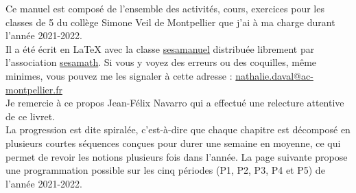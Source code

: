 Ce manuel est composé de l'ensemble des activités, cours, exercices pour les classes de 5 du collège Simone Veil de Montpellier que j'ai à ma charge durant l'année 2021-2022. \\ [1mm]
Il a été écrit en \LaTeX{} avec la classe \href{https://www.ctan.org/pkg/sesamanuel}{\blue sesamanuel} distribuée librement par l'association \href{http://www.sesamath.net}{\blue sesamath}. Si vous y voyez des erreurs ou des coquilles, même minimes, vous pouvez me les signaler à cette adresse : \href{mailto:nathalie.daval@ac-montpellier.fr}{nathalie.daval@ac-montpellier.fr} \\
Je remercie à ce propos Jean-Félix Navarro qui a effectué une relecture attentive de ce livret. \\ [10mm]

La progression est dite spiralée, c'est-à-dire que chaque \og chapitre \fg{} est décomposé en plusieurs courtes séquences conçues pour durer une semaine en moyenne, ce qui permet de revoir les notions plusieurs fois dans l'année. La page suivante propose une programmation possible sur les cinq périodes (P1, P2, P3, P4 et P5) de l'année 2021-2022.

